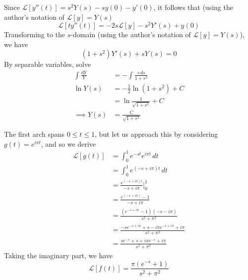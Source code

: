\documentclass[a4paper]{article}
\begin{document}
Since \( \mathcal{L}\!\left[ y''\!\left( t \right) \right] = s^{2}Y \!\left( s \right) - sy \!\left( 0 \right) - y'\!\left( 0 \right) \), it follows that (using the author's notation of \( \mathcal{L}\!\left[ y \right] = Y \!\left( s \right) \)
\[
	\mathcal{L}\!\left[ ty''\!\left( t \right) \right] = -2s \mathcal{L}\!\left[ y \right]- s^{2}Y'\!\left( s \right) + y \!\left( 0 \right) 
\]
Transforming to the \( s \)-domain (using the author's notation of \( \mathcal{L}\!\left[ y \right] = Y \!\left( s \right) \)), we have
\[
	\!\left( 1 + s^{2} \right)Y'\!\left( s \right) + sY \!\left( s \right) = 0
\]
By separable variables, solve
\begin{align*}
	\int \frac{dY}{Y} & = -\int \frac{s \, ds}{1 + s^{2}} \\
	\ln Y \!\left( s \right) & = -\frac{1}{2} \ln\!\left(1 + s^{2}\right) + C \\
				 & = \ln \frac{1}{\sqrt{1 + s^{2}}} + C \\
   \implies Y \!\left( s \right) & = \frac{C}{\sqrt{1 + s^{2}}}
\end{align*}


The first arch spans \( 0 \le t \le 1 \), but let us approach this by considering \( g \!\left( t \right) = e^{i \pi t} \), and so we derive
\begin{align*}
	\mathcal{L}\!\left[ g \!\left( t \right) \right] & = \int^{1}_{0} e^{-st}e^{i \pi t} \, dt \\
	 & = \int^{1}_{0} e^{\!\left( -s + i \pi \right)t} \, dt \\
	 & = \frac{e^{\!\left( -s + i \pi \right)t}}{-s + i \pi} \Big|^{1}_{0} \\
	 & = \frac{e^{\!\left( -s + i \pi \right)} - 1}{-s + i \pi} \\
	 & = \frac{\!\left( e^{-s + i \pi} - 1 \right)\!\left( -s - i \pi \right)}{s^{2} + \pi^{2}} \\
	 & = \frac{-se^{-s + i \pi} + s - i \pi e^{-s + i \pi} + i \pi}{s^{2} + \pi^{2}} \\
	 & = \frac{se^{-s} + s + i \pi e^{-s} + i \pi}{s^{2} + \pi^{2}}
\end{align*}
Taking the imaginary part, we have
\[
	\mathcal{L}\!\left[ f \!\left( t \right) \right] = \frac{\pi \!\left( e^{-s} + 1 \right)}{s^{2} + \pi^{2}} 
\]

\newpage
\end{document}
